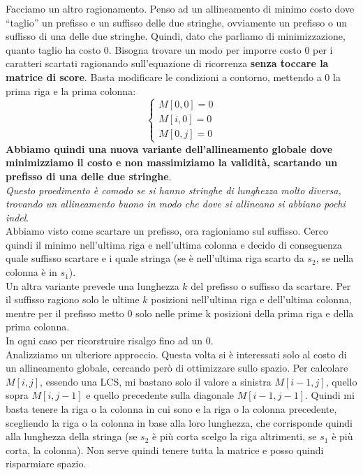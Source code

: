 \documentclass[a4paper,12pt, oneside]{book}
\begin{document}
Facciamo un altro ragionamento. Penso ad un allineamento di minimo
costo dove ``taglio'' un prefisso e un suffisso delle due stringhe,
ovviamente un prefisso o un suffisso di una delle due stringhe.
Quindi, dato che parliamo di minimizzazione, quanto taglio ha
costo 0. Bisogna trovare un modo per imporre costo 0 per i caratteri
scartati ragionando sull'equazione di ricorrenza \textbf{senza toccare la
  matrice di score}. Basta modificare le condizioni a contorno,
mettendo a 0 la prima riga e la prima colonna:
\[
  \begin{cases}
    M[0,0]=0\\
    M[i,0]=0\\
    M[0,j]=0
  \end{cases}
\]
\textbf{Abbiamo quindi una nuova variante dell'allineamento globale
  dove minimizziamo il costo e non massimiziamo la validità, scartando
  un prefisso di una delle due stringhe}.\\
\textit{Questo proedimento è comodo se si hanno stringhe di lunghezza
  molto diversa, trovando un allineamento buono in modo che dove si
  allineano si abbiano pochi indel}.\\
Abbiamo visto come scartare un prefisso, ora ragioniamo sul suffisso.
Cerco quindi il minimo nell'ultima riga e nell'ultima colonna e
decido di conseguenza quale suffisso scartare e i quale stringa (se è
nell'ultima riga scarto da $s_2$, se nella colonna è in $s_1$).\\
Un altra variante prevede una lunghezza $k$ del prefisso o suffisso
da scartare. Per il suffisso ragiono solo le ultime $k$ posizioni
nell'ultima riga e dell'ultima colonna, mentre per il prefisso metto 0
solo nelle prime k posizioni della prima riga e della prima colonna.\\
In ogni caso per ricorstruire risalgo fino ad un 0.\\
Analizziamo un ulteriore approccio. Questa volta si è interessati solo
al costo di un allineamento globale, cercando però di ottimizzare
sullo spazio. Per calcolare $M[i,j]$, essendo una LCS, mi bastano solo
il valore a sinistra $M[i-1,j]$, quello sopra $M[i,j-1]$ e quello
precedente sulla diagonale $M[i-1,j-1]$. Quindi mi basta tenere la
riga o la colonna in cui sono e la riga o la colonna precedente,
scegliendo la riga o la  colonna in base alla loro lunghezza, che
corrisponde quindi alla lunghezza della stringa (se $s_2$ è più corta
scelgo la riga altrimenti, se $s_1$ è più corta, la colonna). Non
serve quindi tenere tutta la matrice e posso quindi risparmiare
spazio.\\
\end{document}
